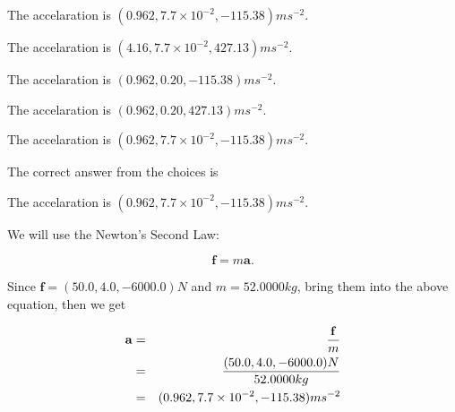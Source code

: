\documentclass[12pt]{article}
\begin{document}
 
The accelaration is $  %
(
0.962,
7.7 \times 10^{-2},
-115.38)
ms^{-2} $.
 
 
The accelaration is $  %
(
4.16,
7.7 \times 10^{-2},
427.13)
ms^{-2} $.
 
 
The accelaration is $  %
(
0.962,
0.20,
-115.38)
ms^{-2} $.
 
 
The accelaration is $  %
(
0.962,
0.20,
427.13)
ms^{-2} $.
 
 
\noindent{}
 
 
The accelaration is $  %
(
0.962,
7.7 \times 10^{-2},
-115.38)
ms^{-2} $.
 
 
\noindent{}
 
 
 
 
 
\noindent{}
 
 

The correct answer from the choices is


The accelaration is $  %
(
0.962,
7.7 \times 10^{-2},
-115.38)
ms^{-2} $.
 
 
 
\noindent{}
 
 

 
 
 
\noindent{}
 
 

We will use the Newton's Second Law:
 
\[
\mathbf{f}=m\mathbf{a}.
\]
 
Since $\mathbf{f}= %
(50.0 , 4.0 , -6000.0) N$
and $m= %
52.0000kg$, bring them into the above equation, then we get
 
\begin{eqnarray*}
\mathbf{a}&=&\frac{\mathbf{f}}m  \\
&=&\frac{ %
(50.0 , 4.0 , -6000.0) N}{ %
52.0000kg}  \\
&=& %
(0.962 , 7.7 \times 10^{-2} , -115.38) ms^{-2}
\end{eqnarray*}
 
\end{document}
